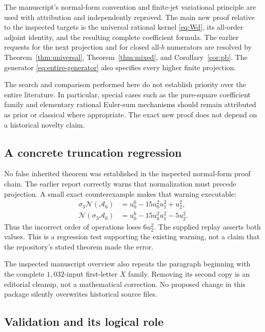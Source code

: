 \documentclass[11pt,letterpaper]{article}
\numberwithin{equation}{section}
\theoremstyle{plain}
\theoremstyle{definition}
\theoremstyle{remark}
\newcommand{\Ac}{\mathcal A}\newcommand{\Nc}{\mathcal N}\newcommand{\Hc}{\mathcal H}
\begin{document}
The manuscript's normal-form convention and finite-jet variational principle are used with attribution and independently reproved. The main new proof relative to the inspected targets is the universal rational kernel \eqref{eq:Wd}, its all-order adjoint identity, and the resulting complete coefficient formula. The earlier requests for the next projection and for closed all-$b$ numerators are resolved by Theorem~\ref{thm:universal}, Theorem~\ref{thm:mixed}, and Corollary~\ref{cor:pb}. The generator \eqref{eq:entire-generator} also specifies every higher finite projection.

The search and comparison performed here do not establish priority over the entire literature. In particular, special cases such as the pure-square coefficient family and elementary rational Euler-sum mechanisms should remain attributed as prior or classical where appropriate. The exact new proof does not depend on a historical novelty claim.

\subsection{A concrete truncation regression}

No false inherited theorem was established in the inspected normal-form proof chain. The earlier report correctly warns that normalization must precede projection. A small exact counterexample makes that warning executable:
\begin{align}
 \sigma_3\Nc(\Ac_6)&=u_0^6-15u_0^2u_1^2+u_2^2,\label{eq:correct-truncation}\\
 \Nc(\sigma_3\Ac_6)&=u_0^6-15u_0^2u_1^2-5u_2^2.\label{eq:wrong-truncation}
\end{align}
Thus the incorrect order of operations loses $6u_2^2$. The supplied replay asserts both values. This is a regression test supporting the existing warning, not a claim that the repository's stated theorem made the error.

The inspected manuscript overview also repeats the paragraph beginning with the complete $1{,}032$-input first-letter $X$ family. Removing its second copy is an editorial cleanup, not a mathematical correction. No proposed change in this package silently overwrites historical source files.

\subsection{Validation and its logical role}
\end{document}
